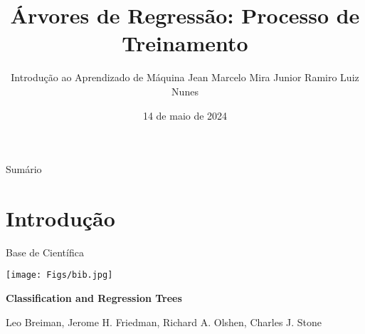 \documentclass[handout,aspectratio = 169]{beamer}
\title{Árvores de Regressão: Processo de Treinamento}
\date{14 de maio de 2024}
\author[]{Introdução ao Aprendizado de Máquina
    \newline Jean Marcelo Mira Junior
    \newline Ramiro Luiz Nunes
}
\begin{document}

\frame{\titlepage}
\section[]{}
\begin{frame}{Sumário}
  \tableofcontents
\end{frame}


\section{Introdução}

\begin{frame}{Base de Científica}
    \centering %
    \begin{minipage}[c]{0.3\textwidth}
        \texttt{[image: Figs/bib.jpg]} %
    \end{minipage}
    \begin{minipage}[c]{0.6\textwidth} %
        \centering %
        \vspace*{\fill} %
        \Large{\textbf{Classification and Regression Trees}} %
        \vspace{1em} %
        
        \small{Leo Breiman, Jerome H. Friedman, Richard A. Olshen, Charles J. Stone} %
        \vspace*{\fill} %
    \end{minipage}
\end{frame}
\end{document}

